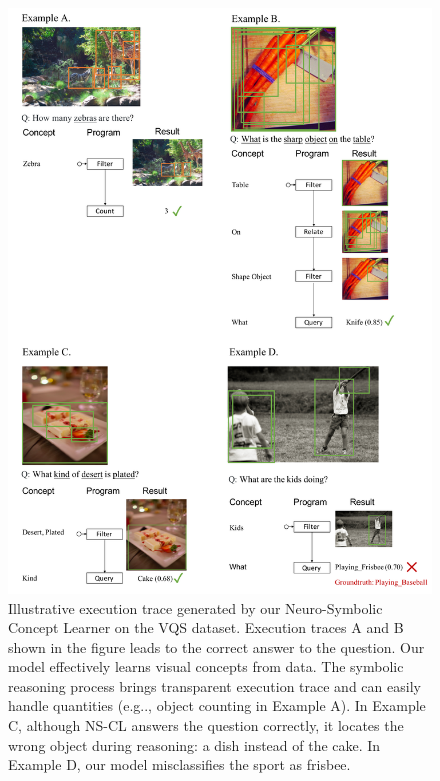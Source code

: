 \documentclass{article} %
\makeatletter
\DeclareRobustCommand\onedot{\futurelet\@let@token\@onedot}
\def\@onedot{\ifx\@let@token.\else.\null\fi\xspace}
\def\eg{e.g\onedot} \def\Eg{E.g\onedot}
\newcommand{\model}{NS-CL\xspace}
\makeatother
\begin{document}
{\begin{figure}[ht]
    \centering
    \includegraphics[width=\textwidth]{raw/VQAInference.pdf}
    \caption{Illustrative execution trace generated by our Neuro-Symbolic Concept Learner on the VQS dataset. Execution traces A and B shown in the figure leads to the correct answer to the question. Our model effectively learns visual concepts from data. The symbolic reasoning process brings transparent execution trace and can easily handle quantities (\eg, object counting in Example A). 
    In Example C, although \model answers the question correctly, it locates the wrong object during reasoning: a dish instead of the cake. In Example D, our model misclassifies the sport as frisbee.
    }
    \label{fig:vis:vqs:1}
\end{figure}

}
\end{document}
